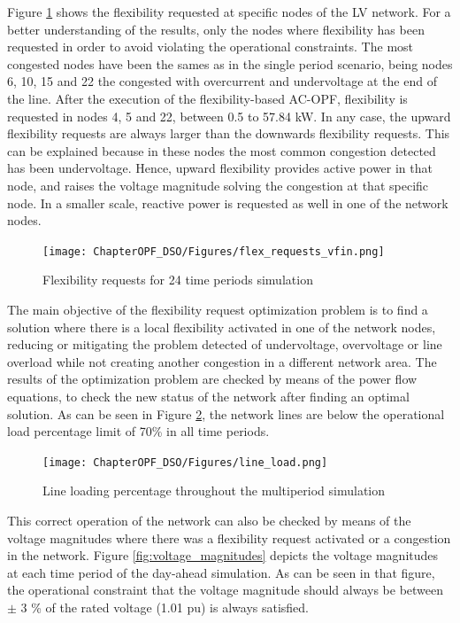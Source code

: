 Figure \ref{fig:flex_requests} shows the flexibility requested at specific nodes of the LV network. For a better understanding of the results, only the nodes where flexibility has been requested in order to avoid violating the operational constraints. The most congested nodes have been the sames as in the single period scenario, being nodes 6, 10, 15 and 22 the congested with overcurrent and undervoltage at the end of the line. After the execution of the flexibility-based AC-OPF, flexibility is requested in nodes 4, 5 and 22, between 0.5 to 57.84 kW. In any case, the upward flexibility requests are always larger than the downwards flexibility requests. This can be explained because in these nodes the most common congestion detected has been undervoltage. Hence, upward flexibility provides active power in that node, and raises the voltage magnitude solving the congestion at that specific node. In a smaller scale, reactive power is requested as well in one of the network nodes. 

\begin{figure}[htbp]
	\centering
	\texttt{[image: ChapterOPF\_DSO/Figures/flex\_requests\_vfin.png]}
	\caption{Flexibility requests for 24 time periods simulation}
	\label{fig:flex_requests}  
\end{figure}

The main objective of the flexibility request optimization problem is to find a solution where there is a local flexibility activated in one of the network nodes, reducing or mitigating the problem detected of undervoltage, overvoltage or line overload while not creating another congestion in a different network area. 
The results of the optimization problem are checked by means of the power flow equations, to check the new status of the network after finding an optimal solution. As can be seen in Figure \ref{fig:line_load}, the network lines are below the operational load percentage limit of 70\% in all time periods. 

\begin{figure}[htbp]
	\centering
	\texttt{[image: ChapterOPF\_DSO/Figures/line\_load.png]}
	\caption{Line loading percentage throughout the multiperiod simulation}
	\label{fig:line_load}  
\end{figure}

This correct operation of the network can also be checked by means of the voltage magnitudes where there was a flexibility request activated or a congestion in the network. Figure \ref{fig:voltage_magnitudes} depicts the voltage magnitudes at each time period of the day-ahead simulation. As  can be seen in that figure, the operational constraint that the voltage magnitude should always be between $\pm$ 3 \% of the rated voltage (1.01 pu) is always satisfied. 

